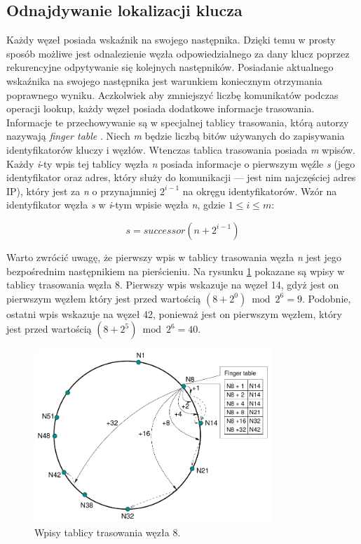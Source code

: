 \documentclass[12pt, twoside, openany]{report}
\begin{document}
\subsection{Odnajdywanie lokalizacji klucza}
\label{odnajdywanie_lokalizacji_klucza}

Każdy węzeł posiada wskaźnik na swojego następnika. Dzięki temu w prosty sposób możliwe jest odnalezienie węzła odpowiedzialnego za dany klucz poprzez rekurencyjne odpytywanie się kolejnych następników. Posiadanie aktualnego wskaźnika na swojego następnika jest warunkiem koniecznym otrzymania poprawnego wyniku. Aczkolwiek aby zmniejszyć liczbę komunikatów podczas operacji lookup, każdy węzeł posiada dodatkowe informacje trasowania. Informacje te przechowywanie są w specjalnej tablicy trasowania, którą autorzy nazywają \textit{finger table} \cite{bib:chord}. Niech \textit{m} będzie liczbą bitów używanych do zapisywania identyfikatorów kluczy i węzłów. Wtenczas tablica trasowania posiada \textit{m} wpisów. Każdy \textit{i}-ty wpis tej tablicy węzła \textit{n} posiada informacje o pierwszym węźle \textit{s} (jego identyfikator oraz adres, który służy do komunikacji --- jest nim najczęściej adres IP), który jest za \textit{n} o przynajmniej $2^{i-1}$ na okręgu identyfikatorów. Wzór na identyfikator węzła \textit{s} w \textit{i}-tym wpisie węzła \textit{n}, gdzie $1\leq i \leq m$:

\begin{equation}
\label{eq:start}
s=successor(n+2^{i-1})
\end{equation}

Warto zwrócić uwagę, że pierwszy wpis w tablicy trasowania węzła \textit{n} jest jego bezpośrednim następnikiem na pierścieniu. Na rysunku \ref{fig:finger_table} pokazane są wpisy w tablicy trasowania węzła 8. Pierwszy wpis wskazuje na węzeł 14, gdyż jest on pierwszym węzłem który jest przed wartością $(8+2^0) \bmod 2^6=9$. Podobnie, ostatni wpis wskazuje na węzeł 42, ponieważ jest on pierwszym węzłem, który jest przed wartością $(8+2^5) \bmod 2^6=40$.

\begin{figure}[H]
\centering
\includegraphics[width=0.8\textwidth,height=\textheight,keepaspectratio]{finger_table.png}
\caption{Wpisy tablicy trasowania węzła 8.}
\label{fig:finger_table}
\end{figure}
\end{document}
